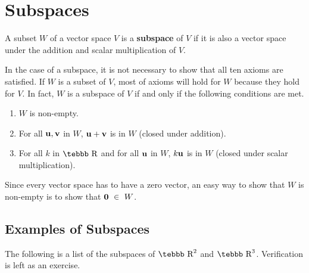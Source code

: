 \section{Subspaces}
\label{ssec.subspace}
A subset $W$ of a vector space $V$ is a {\bf subspace} of $V$ if
it is also a vector space under the addition and scalar
multiplication of $V$.

In the case of a subspace, it is not necessary to show that all
ten axioms are satisfied. If $W$ is a subset of $V$, most of
axioms will hold for $W$ because they hold for $V$. In fact, $W$
is a subspace of $V$ if and only if the following conditions are
met.

\begin{enumerate}
\item  $W$ is non-empty.
\item For all ${\bf u,v}$ in $W$,  ${\bf u}+{\bf v}$ is in $W$ (closed
under addition). \item For all $ k$ in $\mbox{\tebbb R}$ and for
all ${\bf u}$ in $W$, $k{\bf u}$ is in $W$ (closed under scalar
multiplication).
\end{enumerate}

Since every vector space has to have a zero vector, an easy way to
show that $W$ is non-empty is to show that ${\bf 0}~\in~W$.

\subsection*{Examples of Subspaces}

The following is a list of the subspaces of $\mbox{\tebbb R}^2$
and $\mbox{\tebbb R}^3$. Verification is left as an exercise.

